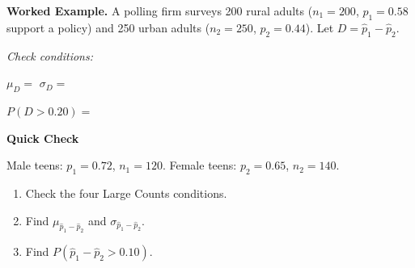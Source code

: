 \documentclass[10pt]{article}
\begin{document}
\begin{notesbox}
\textbf{Worked Example.}
A polling firm surveys 200 rural adults ($n_1 = 200$, $p_1 = 0.58$ support a policy)
and 250 urban adults ($n_2 = 250$, $p_2 = 0.44$). Let $D = \hat{p}_1 - \hat{p}_2$.

\medskip
\textit{Check conditions:} 

$\mu_D = $ \blank{1in} \hspace{1cm} $\sigma_D = $ \blank{2.2in}

\medskip
$P(D > 0.20) = $ 
\end{notesbox}

\begin{practicebox}
\textbf{Quick Check}

Male teens: $p_1 = 0.72$, $n_1 = 120$. Female teens: $p_2 = 0.65$, $n_2 = 140$.
\begin{enumerate}
  \item Check the four Large Counts conditions.
        \vspace{0.5in}
  \item Find $\mu_{\hat{p}_1 - \hat{p}_2}$ and $\sigma_{\hat{p}_1 - \hat{p}_2}$.
        \vspace{0.5in}
  \item Find $P(\hat{p}_1 - \hat{p}_2 > 0.10)$.
        \vspace{0.8in}
\end{enumerate}
\end{practicebox}
\end{document}
